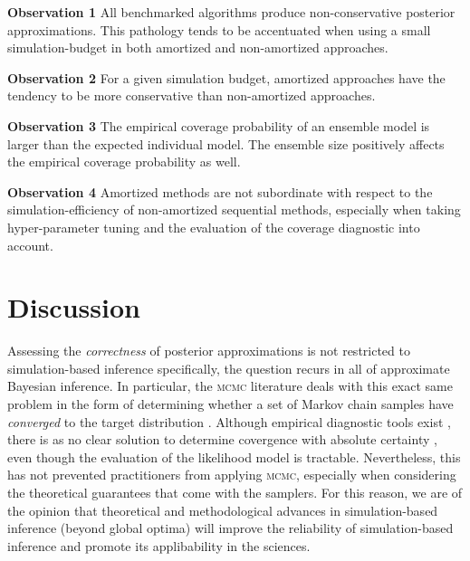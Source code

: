 \documentclass[twoside]{article}
\begin{document}
\medskip

\begin{custombox}
{\bfseries Observation 1} All benchmarked algorithms produce non-conservative posterior approximations. This pathology tends to be accentuated when using a small simulation-budget in both amortized and non-amortized approaches.

\medskip

{\bfseries Observation 2} For a given simulation budget, amortized approaches have the tendency to be more conservative than non-amortized approaches. 

\medskip

{\bfseries Observation 3} The empirical coverage probability of an ensemble model is larger than the expected individual model. The ensemble size positively affects the empirical coverage probability as well.

\medskip

{\bfseries Observation 4} Amortized methods are not subordinate with respect to the simulation-efficiency of non-amortized sequential methods, especially when taking hyper-parameter tuning and the evaluation of the coverage diagnostic into account.
\end{custombox}
\section{Discussion}
\label{sec:discussion}
Assessing the \emph{correctness} of posterior approximations is not restricted to simulation-based inference specifically, the question recurs in all of approximate Bayesian inference. 
In particular, the \textsc{mcmc} literature deals with this exact same problem in the form of determining whether a set of Markov chain samples have \emph{converged} to the target distribution \citep{lin2014integrated,hogg2018data}. 
Although empirical diagnostic tools exist \citep{geweke1991evaluating,gelman1992inference,raftery1991many,dixit2017mcmc},
there is as no clear solution to determine covergence with absolute certainty \citep{dixit2018developments,roy2020convergence}, even though the evaluation of the likelihood model is tractable.
Nevertheless, this has not prevented practitioners from applying \textsc{mcmc}, especially when considering the theoretical guarantees that come with the samplers. For this reason, we are of the opinion that theoretical and methodological advances in simulation-based inference (beyond global optima) will improve the reliability of simulation-based inference and promote its applibability in the sciences.
\end{document}
